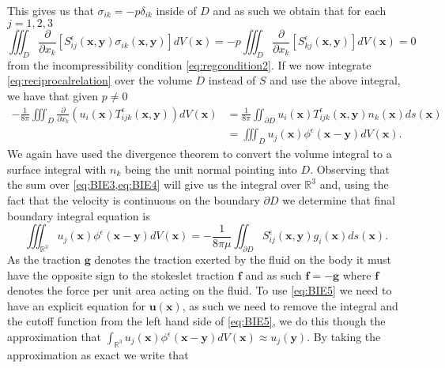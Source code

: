This gives us that $\sigma_{ik} = -p\delta_{ik}$ inside of $D$ and as such we obtain that for each $j=1,2,3$
\begin{equation*}
  \iiint_{D} \frac{\partial}{\partial x_k}\left[S^\epsilon_{ij}\left(\bm{x}, \bm{y}\right)\sigma_{ik}\left(\bm{x}, \bm{y}\right)\right]dV(\bm{x}) = -p\iiint_{D} \frac{\partial}{\partial x_k}\left[S^\epsilon_{kj}\left(\bm{x}, \bm{y}\right)\right]dV(\bm{x}) = 0
\end{equation*}
from the incompressibility condition \cref{eq:regcondition2}. If we now integrate \cref{eq:reciprocalrelation} over the volume $D$ instead of $S$ and use the above integral, we have that given $p \neq 0$
\begin{equation}
\begin{aligned}
    \label{eq:BIE4}
    -\frac{1}{8\pi}\iiint_{D} \frac{\partial}{\partial x_k}\left(u_i(\bm{x})T^\epsilon_{ijk}\left(\bm{x}, \bm{y}\right) \right) dV(\bm{x}) &= \frac{1}{8\pi}\iint_{\partial D} u_i(\bm{x})T^\epsilon_{ijk}\left(\bm{x}, \bm{y}\right)n_k(\bm{x}) ds(\bm{x})\\
    &= \iiint_D u_j(\bm{x}) \phi^\epsilon(\bm{x}-\bm{y}) dV(\bm{x}).
\end{aligned}
\end{equation}
We again have used the divergence theorem to convert the volume integral to a surface integral with $n_k$ being the unit normal pointing into $D$. Observing that the sum over \cref{eq:BIE3,eq:BIE4} will give us the integral over $\mathbb{R}^{3}$ and, using the fact that the velocity is continuous on the boundary $\partial D$ we determine that final boundary integral equation is
\begin{equation}
  \label{eq:BIE5}
    \iiint_{\mathbb{R}^{3}} u_{j}(\bm{x}) \phi^{\epsilon}\left(\bm{x}-\bm{y}\right) d V(\bm{x})=-\frac{1}{8 \pi \mu} \iint_{\partial D} S_{i j}^{\epsilon}\left(\bm{x}, \bm{y}\right) g_{i}(\bm{x}) d s(\bm{x}).
\end{equation}
As the traction $\bm{g}$ denotes the traction exerted by the fluid on the body it must have the opposite sign to the stokeslet traction $\bm{f}$ and as such $\bm{f} = -\bm{g}$ where $\bm{f}$ denotes the force per unit area acting on the fluid. To use \cref{eq:BIE5} we need to have an explicit equation for $\bm{u}(\bm{x})$, as such we need to remove the integral and the cutoff function from the left hand side of \cref{eq:BIE5}, we do this though the approximation that $\int_{\mathbb{R}^{3}} u_{j}(\bm{x}) \phi^{\epsilon}\left(\bm{x}-\bm{y}\right) d V(\bm{x}) \approx u_j(\bm{y})$. By taking the approximation as exact we write that 
